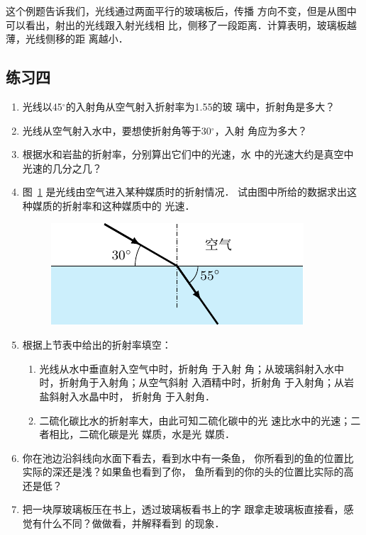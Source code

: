 这个例题告诉我们，光线通过两面平行的玻璃板后，传播
方向不变，但是从图中可以看出，射出的光线跟入射光线相
比，侧移了一段距离．计算表明，玻璃板越薄，光线侧移的距
离越小．

\subsection*{练习四}
\begin{enumerate}
    \item 光线以45$^\circ$的入射角从空气射入折射率为1.55的玻
璃中，折射角是多大？
\item 光线从空气射入水中，要想使折射角等于30$^\circ$，入射
角应为多大？
\item 根据水和岩盐的折射率，分别算出它们中的光速，水
中的光速大约是真空中光速的几分之几？
\item 图~\ref{fig_C_5-22} 是光线由空气进入某种媒质时的折射情况．
试由图中所给的数据求出这种媒质的折射率和这种媒质中的
光速．
\begin{figure}[htbp]
    \centering
    \includegraphics{fig/C/5-22.pdf}
    \caption{}\label{fig_C_5-22}
\end{figure}

    \item 根据上节表中给出的折射率填空：
    \begin{enumerate}
        \item 光线从水中垂直射入空气中时，折射角\underline{\qquad}
    于入射
    角；从玻璃斜射入水中时，折射角\underline{\qquad}于入射角；从空气斜射
    入酒精中时，折射角\underline{\qquad}
    于入射角；从岩盐斜射入水晶中时，
    折射角\underline{\qquad}
    于入射角．
    \item 二硫化碳比水的折射率大，由此可知二硫化碳中的光
    速比水中的光速\underline{\qquad}；二者相比，二硫化碳是光\underline{\qquad}
    媒质，水是光\underline{\qquad}
    媒质．
    \end{enumerate}
    
    \item 你在池边沿斜线向水面下看去，看到水中有一条鱼，
    你所看到的鱼的位置比实际的深还是浅？如果鱼也看到了你，
    鱼所看到的你的头的位置比实际的高还是低？
    \item 把一块厚玻璃板压在书上，透过玻璃板看书上的字
    跟拿走玻璃板直接看，感觉有什么不同？做做看，并解释看到
    的现象．
\end{enumerate}

